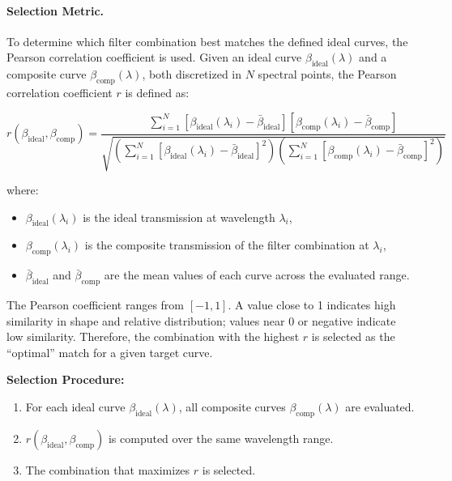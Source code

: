 \paragraph{Selection Metric.}
To determine which filter combination best matches the defined ideal curves, the Pearson correlation coefficient is used. Given an ideal curve \(\beta_{\text{ideal}}(\lambda)\) and a composite curve \(\beta_{\text{comp}}(\lambda)\), both discretized in \(N\) spectral points, the Pearson correlation coefficient \(r\) is defined as:

\begin{equation}
r(\beta_{\text{ideal}}, \beta_{\text{comp}}) =
\frac{
    \displaystyle \sum_{i=1}^{N} 
    \left[\beta_{\text{ideal}}(\lambda_i) - \bar{\beta}_{\text{ideal}}\right]
    \left[\beta_{\text{comp}}(\lambda_i) - \bar{\beta}_{\text{comp}}\right]
}{
    \sqrt{
        \left(
        \displaystyle \sum_{i=1}^{N} 
        \left[\beta_{\text{ideal}}(\lambda_i) - \bar{\beta}_{\text{ideal}}\right]^2
        \right)
        \left(
        \displaystyle \sum_{i=1}^{N} 
        \left[\beta_{\text{comp}}(\lambda_i) - \bar{\beta}_{\text{comp}}\right]^2
        \right)
    }
}
\end{equation}

where:
\begin{itemize}
    \item \(\beta_{\text{ideal}}(\lambda_i)\) is the ideal transmission at wavelength \(\lambda_i\),
    \item \(\beta_{\text{comp}}(\lambda_i)\) is the composite transmission of the filter combination at \(\lambda_i\),
    \item \(\bar{\beta}_{\text{ideal}}\) and \(\bar{\beta}_{\text{comp}}\) are the mean values of each curve across the evaluated range.
\end{itemize}

The Pearson coefficient ranges from \([-1, 1]\). A value close to 1 indicates high similarity in shape and relative distribution; values near 0 or negative indicate low similarity. Therefore, the combination with the highest \(r\) is selected as the “optimal” match for a given target curve.

\medskip

\noindent
\textbf{Selection Procedure:}
\begin{enumerate}
    \item For each ideal curve \(\beta_{\text{ideal}}(\lambda)\), all composite curves \(\beta_{\text{comp}}(\lambda)\) are evaluated.
    \item \(r(\beta_{\text{ideal}}, \beta_{\text{comp}})\) is computed over the same wavelength range.
    \item The combination that maximizes \(r\) is selected.
\end{enumerate}

